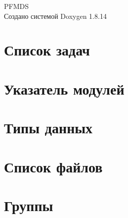 \documentclass[twoside]{book}
\newcommand{\+}{\discretionary{\mbox{\scriptsize$\hookleftarrow$}}{}{}}
\newcommand{\clearemptydoublepage}{%
  \newpage{\pagestyle{empty}\cleardoublepage}%
}
\begin{document}
\hypersetup{pageanchor=false,
             bookmarksnumbered=true,
             pdfencoding=unicode
            }
\begin{titlepage}
\vspace*{7cm}
\begin{center}%
{\Large P\+F\+M\+DS }\\
\vspace*{1cm}
{\large Создано системой Doxygen 1.8.14}\\
\end{center}
\end{titlepage}
\clearemptydoublepage
{}
\tableofcontents
\clearemptydoublepage
{}
\hypersetup{pageanchor=true}

\chapter{Список задач}
\label{todo}

\chapter{Указатель модулей}

\chapter{Типы данных}

\chapter{Список файлов}

\chapter{Группы}




















\end{document}
